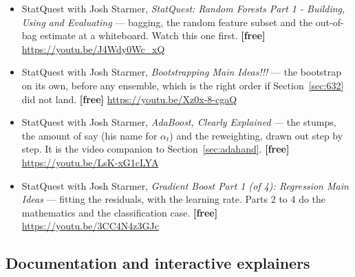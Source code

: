 \documentclass[11pt]{article}
\begin{document}
\begin{itemize}[leftmargin=*]
  \item StatQuest with Josh Starmer, \emph{StatQuest: Random Forests Part 1 -
    Building, Using and Evaluating} --- bagging, the random feature subset and
    the out-of-bag estimate at a whiteboard. Watch this one first.
    \textbf{[free]} \url{https://youtu.be/J4Wdy0Wc_xQ}
  \item StatQuest with Josh Starmer, \emph{Bootstrapping Main Ideas!!!} --- the
    bootstrap on its own, before any ensemble, which is the right order if
    Section~\ref{sec:632} did not land. \textbf{[free]}
    \url{https://youtu.be/Xz0x-8-cgaQ}
  \item StatQuest with Josh Starmer, \emph{AdaBoost, Clearly Explained} --- the
    stumps, the amount of say (his name for $\alpha_t$) and the reweighting,
    drawn out step by step. It is the video companion to
    Section~\ref{sec:adahand}. \textbf{[free]}
    \url{https://youtu.be/LsK-xG1cLYA}
  \item StatQuest with Josh Starmer, \emph{Gradient Boost Part 1 (of 4):
    Regression Main Ideas} --- fitting the residuals, with the learning rate.
    Parts 2 to 4 do the mathematics and the classification case.
    \textbf{[free]} \url{https://youtu.be/3CC4N4z3GJc}
\end{itemize}

\subsection*{Documentation and interactive explainers}
\end{document}
